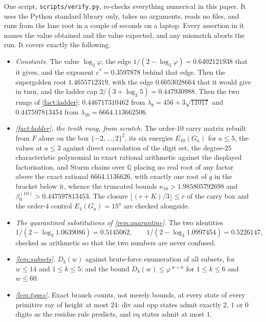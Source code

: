 \documentclass[11pt]{amsart}
\theoremstyle{definition}
\theoremstyle{remark}
\begin{document}
One script, \texttt{scripts/verify.py}, re-checks everything numerical in this paper. It uses the Python standard library only, takes no arguments, reads no files, and runs from the lane root in a couple of seconds on a laptop. Every assertion in it names the value obtained and the value expected, and any mismatch aborts the run. It covers exactly the following.

\begin{itemize}
  \item \emph{Constants.} The value $\log_3\varphi$, the edge $1/(2-\log_3\varphi) = 0.6402121938$ that it gives, and the exponent $c^* = 0.3597878$ behind that edge. Then the supergolden root $1.4655712319$, with the edge $0.6053028664$ that it would give in turn, and the ladder cap $2/(3+\log_3 5) = 0.447930988$. Then the two rungs of \cref{fact:ladder}: $0.446717310462$ from $\lambda_8 = 456+3\sqrt{11017}$ and $0.447597813454$ from $\lambda_{10} = 6664.113662506$.
  \item \emph{\cref{fact:ladder}, the tenth rung, from scratch.} The order-$10$ carry matrix rebuilt from $F$ alone on the box $\{-2,\dots,2\}^2$, its six energies $E_{10}(G_a)$ for $a \le 5$, the values at $a \le 3$ against direct convolution of the digit set, the degree-$25$ characteristic polynomial in exact rational arithmetic against the displayed factorisation, and Sturm chains over $\mathbb Q$ placing no real root of any factor above the exact rational $6664.1136626$, with exactly one root of $q$ in the bracket below it, whence the truncated bounds $\kappa_{10} > 1.985805792698$ and $\beta_0^{(10)} > 0.447597813453$. The closure $\lfloor (r+K)/3 \rfloor \le r$ of the carry box and the order-$4$ control $E_4(G_a) = 15^a$ are checked alongside.
  \item \emph{The quarantined substitutions of \cref{rem:quarantine}.} The two identities
  \[
    1/(2-\log_3 1.0639086) = 0.5145062, \qquad 1/(2-\log_3 1.0997454) = 0.5226147 ,
  \]
  checked as arithmetic so that the two numbers are never confused.
  \item \emph{\cref{lem:subsets}.} $D_k(w)$ against brute-force enumeration of all subsets, for $w \le 14$ and $1 \le k \le 5$; and the bound $D_k(w) \le \varphi^{\,w+k}$ for $1 \le k \le 6$ and $w \le 60$.
  \item \emph{\cref{lem:types}.} Exact branch counts, not merely bounds, at every state of every primitive ray of height at most $24$: div and opp states admit exactly $2$, $1$ or $0$ digits as the residue rule predicts, and eq states admit at most $1$.

\end{itemize}
\end{document}
